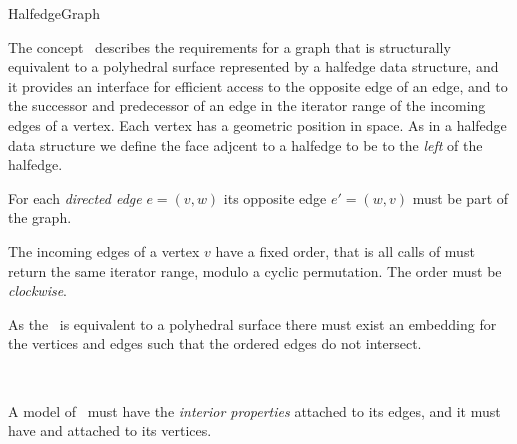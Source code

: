 
\begin{ccRefConcept}{HalfedgeGraph}


\ccDefinition

The concept \ccRefName\ describes the requirements for a graph that is
structurally equivalent to a polyhedral surface represented by a
halfedge data structure, and it provides an interface for efficient
access to the opposite edge of an edge, and to the successor and
predecessor of an edge in the iterator range of the incoming edges of
a vertex.  Each vertex has a geometric position in space. As in a
halfedge data structure we define the face adjcent to a halfedge to be
to the {\em left} of the halfedge.



For each {\em directed edge} $e=(v,w)$ its opposite edge $e'=(w,v)$
must be part of the graph.

The incoming edges of a vertex $v$ have a fixed order, that is all
calls of  must return the same iterator range,
modulo a cyclic permutation. The order must be {\em clockwise}.

As the \ccRefName\ is equivalent to a polyhedral surface there must exist an embedding
for the vertices and edges such that the ordered edges do not intersect.


\ccRefines
{}\\

A model of \ccRefName\ must have the {\em interior properties} 
 attached to its edges,
and it must have  and  attached to its vertices.





\end{ccRefConcept}
